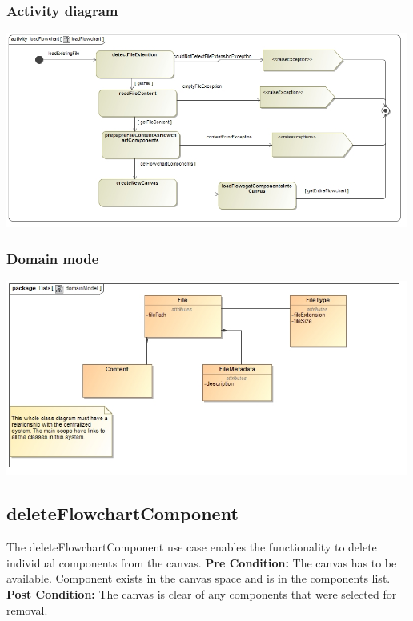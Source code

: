 \documentclass[11pt,a4paper,titlepage]{article}
\begin{document}
\subsubsection{Activity diagram}
\includegraphics[width=500px]{loadFlowchart_activity_diagram.jpg}

\subsubsection{Domain mode}
\includegraphics[width=500px]{loadFlowchart_domain_model.jpg}

\subsection{deleteFlowchartComponent}
The deleteFlowchartComponent use case enables the functionality to delete individual components from the canvas.
\newline\newline
\textbf{Pre Condition:} The canvas has to be available. Component exists in the canvas space and is in the components list.
\newline\newline
\textbf{Post Condition:} The canvas is clear of any components that were selected for removal.
\end{document}
